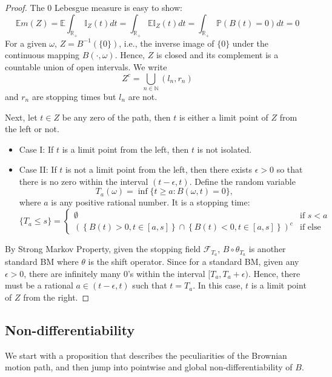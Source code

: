 \documentclass{article}
\theoremstyle{plain}
\theoremstyle{definition}
\begin{document}
\begin{proof}
The $0$ Lebesgue measure is easy to show:
\[
\mathbb{E}m(Z) = \mathbb{E}\int_{\mathbb{R}_+}\mathbb{I}_Z(t)dt = \int_{\mathbb{R}_+}\mathbb{E}\mathbb{I}_Z(t)dt = \int_{\mathbb{R}_+}\mathbb{P}(B(t)=0)dt = 0
\]
For a given $\omega$, $Z = B^{-1}(\{0\})$, i.e., the inverse image of $\{0\}$ under the continuous mapping $B(\cdot,\omega)$. Hence, $Z$ is closed and its complement is a countable union of open intervals. We write
\[
Z^c = \bigcup_{n\in\mathbb{N}}(l_n,r_n)
\]
and $r_n$ are stopping times but $l_n$ are not.

Next, let $t\in Z$ be any zero of the path, then $t$ is either a limit point of $Z$ from the left or not.

\begin{itemize}
    \item Case I: If $t$ is a limit point from the left, then $t$ is not isolated.
    \item Case II: If $t$ is not a limit point from the left, then there exists $\epsilon>0$ so that there is no zero within the interval $(t-\epsilon,t)$. Define the random variable
    \[
    T_a(\omega) = \inf\{t\ge a : B(\omega, t) = 0\},
    \]
    where $a$ is any positive rational number. It is a stopping time:
    \[
    \{T_a \le s\} = 
    \begin{cases}
        \emptyset & \text{if } s < a\\
        \left(\left\{B(t)>0,t\in[a,s]\right\}\cap\left\{B(t)<0,t\in[a,s]\right\}\right)^c & \text{if else}
    \end{cases}
    \]
\end{itemize}

By Strong Markov Property, given the stopping field $\mathcal{F}_{T_a}$, $B\circ \theta_{T_a}$ is another standard BM where $\theta$ is the shift operator. Since for a standard BM, given any $\epsilon>0$, there are infinitely many $0$'s within the interval $[T_a, T_a+\epsilon)$. Hence, there must be a rational $a\in(t-\epsilon,t)$ such that $t = T_a$. In this case, $t$ is a limit point of $Z$ from the right.
\end{proof}

\subsection{Non-differentiability}

We start with a proposition that describes the peculiarities of the Brownian motion path, and then jump into pointwise and global non-differentiability of $B$.
\end{document}
